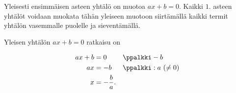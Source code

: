 Yleisesti ensimmäisen asteen yhtälö on muotoa $ax + b = 0$. Kaikki $1$. asteen yhtälöt voidaan muokata tähän yleiseen muotoon siirtämällä kaikki termit yhtälön vasemmalle puolelle ja sieventämällä.

Yleisen yhtälön $ax + b = 0$ ratkaisu on

\begin{align*}
	 ax + b &= 0  && \ppalkki -b\\
	 ax &= -b  && \ppalkki : a \ (\neq 0)\\
  x &= -\frac{b}{a}.
\end{align*}


